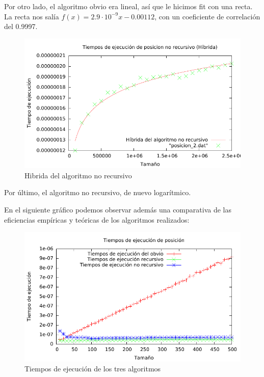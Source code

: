 Por otro lado, el algoritmo obvio era lineal, así que le hicimos fit con una recta. La recta nos salía $f(x) = 2.9\cdot 10^{-9} x - 0.00112$, con un coeficiente de correlación del 0.9997.

\begin{figure}[H]\includegraphics[width=13cm]{img/posicion_2_hibrida.pdf} \centering
\caption{Hibrida del algoritmo no recursivo}\end{figure}

Por último, el algoritmo no recursivo, de nuevo logarítmico.


En el siguiente gráfico podemos observar además una comparativa de las eficiencias empíricas y teóricas de los algoritmos realizados:

\begin{figure}[H]\includegraphics[width=13cm]{img/posicion_1_comparativa_todos.pdf} \centering
	\caption{Tiempos de ejecución de los tres algoritmos}\end{figure}

